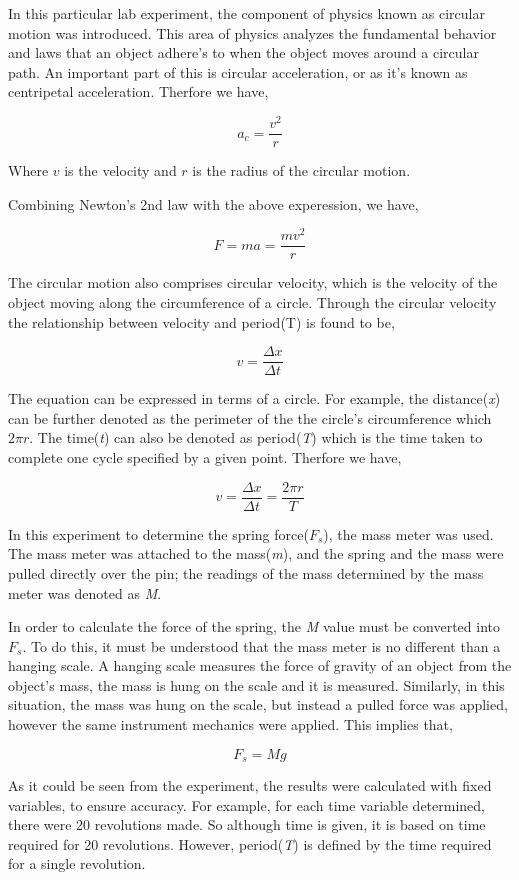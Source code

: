 
	{In this particular lab experiment, the component of physics known as circular motion was introduced. This area of physics analyzes the fundamental behavior and laws that an object adhere's to when the object moves around a circular path. An important part of this is circular acceleration, or as it’s known as centripetal acceleration. Therfore we have,}

		$$a_{c} = \frac{v^{2}}{r}$$

	{Where $v$ is the velocity and $r$ is the radius of the circular motion.}

	{Combining Newton's 2nd law with the above experession, we have,}

		$$F = ma = \frac{mv^2}{r}$$

	{The circular motion also comprises circular velocity, which is the velocity of the object moving
along the circumference of a circle. Through the circular velocity the relationship between
velocity and period(T) is found to be,}

		$$v = \frac{\Delta x}{\Delta t}$$

	{The equation can be expressed in terms of a circle. For example, the distance(\textit{x}) can be further denoted as the perimeter of the the circle’s circumference which $2\pi r$. The time(\textit{t}) can also be denoted as period(\textit{T}) which is the time taken to complete one cycle specified by a given point. Therfore we have,}

		$$v = \frac{\Delta x}{\Delta t} = \frac{2\pi r}{T}$$

	{In this experiment to determine the spring force($F_{s}$), the mass meter was used. The mass meter was attached to the mass(\textit{m}), and the spring and the mass were pulled directly over the pin; the readings of the mass determined by the mass meter was denoted as \textit{M}.}

	{In order to calculate the force of the spring, the \textit{M} value must be converted into $F_{s}$. To do this, it must be understood that the mass meter is no different than a hanging scale. A hanging scale measures the force of gravity of an object from the object’s mass, the mass is hung on the scale and it is measured. Similarly, in this situation, the mass was hung on the scale, but instead a pulled force was applied, however the same instrument mechanics were applied. This implies that,}

		$$F_{s} = Mg$$

	{As it could be seen from the experiment, the results were calculated with fixed variables, to ensure accuracy. For example, for each time variable determined, there were 20 revolutions made. So although time is given, it is based on time required for 20 revolutions. However, period(\textit{T}) is defined by the time required for a single revolution.}

